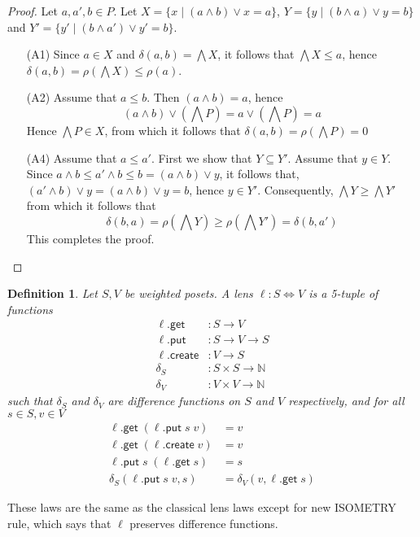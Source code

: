 \documentclass[acmsmall,review,anonymous]{acmart}\settopmatter{printfolios=true,printccs=false,printacmref=false}
\newtheorem{definition}{Definition}
\newcommand{\kw}[1]{\ensuremath{\mathsf{#1}}}
\newcommand{\get}{\ensuremath{\kw{get}}}
\newcommand{\pput}{\ensuremath{\kw{put}}}
\newcommand{\create}{\ensuremath{\kw{create}}}
\begin{document}
\begin{proof}
Let $a, a', b \in P$.  Let $X = \{x \; | \; (a \wedge b) \vee x =  a\}$, $Y =
\{y \; | \; (b \wedge a) \vee y = b\}$ and $Y' = \{y' \; | \; (b \wedge a')
\vee y' = b\}$.
\begin{enumerate}
  \item[(A1)]
  Since $a \in X$ and $\delta(a, b) = \bigwedge X$, it follows that
  $\bigwedge X \leq a$, hence $\delta(a, b) = \rho\left(\bigwedge X \right) \leq
  \rho(a)$.
  \item[(A2)]
  Assume that $a \leq b$. Then $(a \wedge b) = a$, hence
  $$(a \wedge b) \vee \left(\bigwedge P\right) = a \vee\left(\bigwedge P\right)
  = a$$
  Hence $\bigwedge P \in X$, from which it follows that $\delta(a, b) =
  \rho\left(\bigwedge P\right) = 0$
  \item[(A4)]
  Assume that $a \leq a'$. First we show that $Y \subseteq Y'$. Assume that
  $y \in Y$. Since $a \wedge b \leq a' \wedge b \leq b = (a \wedge b) \vee y$,
  it follows that, $(a' \wedge b) \vee y = (a \wedge b) \vee y = b$, hence $y
  \in Y'$. Consequently, $\bigwedge Y \geq \bigwedge Y'$ from which it follows
  that $$\delta(b, a) =\rho\left(\bigwedge Y\right) \geq \rho\left(\bigwedge
  Y'\right) = \delta(b, a')$$
  This completes the proof.
\end{enumerate}
\end{proof}

\begin{definition}
Let $S, V$ be weighted posets. A lens $\ell : S \Leftrightarrow V$ is a
5-tuple of functions
\begin{align*}
\ell.\get &: S \longrightarrow V\\
\ell.\pput &: S \longrightarrow V \longrightarrow S\\
\ell.\create &: V \longrightarrow S\\
\delta_S &: S \times S \longrightarrow \mathbb{N}\\
\delta_V &: V \times V \longrightarrow \mathbb{N}
\end{align*}
such that $\delta_S$ and $\delta_V$ are difference functions on $S$ and $V$
respectively, and for all $s \in S, v \in V$
\begin{align*}
\ell.\get \; (\ell.\pput \; s \; v) &= v \tag{PUTGET}\\
\ell.\get \; (\ell.\create \; v) &= v \tag{CREATEGET}\\
\ell.\pput \; s \; (\ell.\get \; s) &= s \tag{GETPUT}\\
\delta_S(\ell.\pput \; s \; v, s) &= \delta_V(v, \ell.\get \; s) \tag{ISOMETRY}
\end{align*}
\end{definition}
These laws are the same as the classical lens laws except for new ISOMETRY rule,
which says that $\ell$ preserves difference functions.
\end{document}
